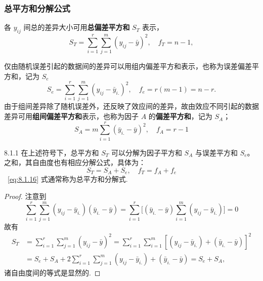 \subsubsection{总平方和分解公式}

各 $y_{ij}$ 间总的差异大小可用\textbf{总偏差平方和} $S_T$ 表示，
\begin{equation}\label{eq:8.1.13}
  S_{T}=\sum_{i=1}^{r} \sum_{j=1}^{m}\left(y_{i j}-\bar{y}\right)^{2}, \quad f_{T} = n-1,
\end{equation}

仅由随机误差引起的数据间的差异可以用组内偏差平方和表示，也称为误差偏差平方和，记为 $S_e$
\begin{equation}\label{eq:8.1.14}
  S_{e}=\sum_{i=1}^{r} \sum_{j=1}^{m}\left(y_{i j}-\bar{y}_{i .}\right)^{2}, \quad f_{e}=r(m-1)=n-r.
\end{equation}
由于组间差异除了随机误差外，还反映了效应间的差异，故由效应不同引起的数据差异可用\textbf{组间偏差平方和}表示，也称为因子 $A$ 的\textbf{偏差平方和}，记为 $S_A$；
\begin{equation}\label{eq:8.1.15}
  S_{A}=m \sum_{i=1}^{r}\left(\bar{y}_{i.}-\bar{y}\right)^{2}, \quad f_{A}=r-1
\end{equation}

\begin{theorem}{}{8.1.1}
在上述符号下，总平方和 $S_T$ 可以分解为因子平方和 $S_A$ 与误差平方和 $S_e$。之和，其自由度也有相应分解公式，具体为：
\begin{equation} \label{eq:8.1.16}
S_{T}=S_{A}+ S_{e}, \quad f_{T}=f_{A}+f_{e}
\end{equation}
~\eqref{eq:8.1.16} 式通常称为总平方和分解式. 
\end{theorem}

\begin{proof}
注意到
  \begin{equation*}
    \sum_{i=1}^{r} \sum_{j=1}^{m}(y_{i j}-\bar{y}_{i.})(\bar{y}_{i.}-\bar{y})= \sum_{i=1}^{r}\big[(\bar{y}_{i.}-\bar{y}) \sum_{i=1}^{m}(y_{i j}-\bar{y}_{i.})\big]=0
    \end{equation*}
故有
    \begin{align*}
      S_{T} & =\sum_{i=1}^{r} \sum_{j=1}^{m}(y_{i j}-\bar{y})^{2} = \sum_{i=1}^{r} \sum_{i=1}^{m}[(y_{i j}-\bar{y}_{i.})+(\bar{y}_{i.}-\bar{y})]^{2}\\
      &=S_{e}+S_{A} + 2 \sum_{i=1}^{r} \sum_{j=1}^{m}(y_{i j}-\bar{y}_{i.})+(\bar{y}_{i .}-\bar{y}) = S_{e} + S_{A},
    \end{align*}
诸自由度间的等式是显然的.
\end{proof}

